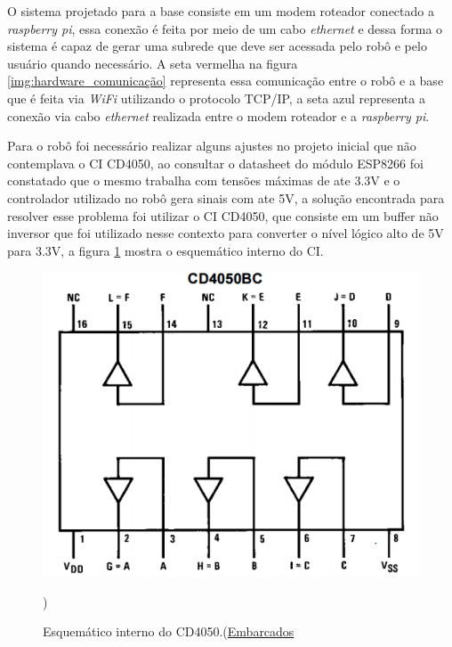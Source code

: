     	O sistema projetado para a base consiste em um modem roteador conectado a \textit{raspberry pi}, essa conexão é feita por meio de um cabo \textit{ethernet} e dessa forma o sistema é capaz de gerar uma subrede que deve ser acessada pelo robô e pelo usuário quando necessário. A seta vermelha na figura \ref{img:hardware_comunicação} representa essa comunicação entre o robô e a base que é feita via \textit{WiFi} utilizando o protocolo TCP/IP, a seta azul representa a conexão via cabo \textit{ethernet} realizada entre o modem roteador e a \textit{raspberry pi}.

    	Para o robô foi necessário realizar alguns ajustes no projeto inicial que não contemplava o CI CD4050, ao consultar o datasheet do módulo ESP8266 foi constatado que o mesmo trabalha com tensões máximas de ate 3.3V e o controlador utilizado no robô gera sinais com ate 5V, a solução encontrada para resolver esse problema foi utilizar o CI CD4050, que consiste em um buffer não inversor que foi utilizado nesse contexto para converter o nível lógico alto de 5V para 3.3V, a figura \ref{img:datasheet_cd4050} mostra o esquemático interno do CI.

    	\begin{figure}[H]                                                           
      		\centering                    
      		\includegraphics[scale=0.4]{figuras/cd4050.png}               
      		\caption{Esquemático interno do CD4050.(\href{http://www.embarcados.com.br/esp8266-com-arduino/}{Embarcados}})    
      		\label{img:datasheet_cd4050}                                            
    	\end{figure}

